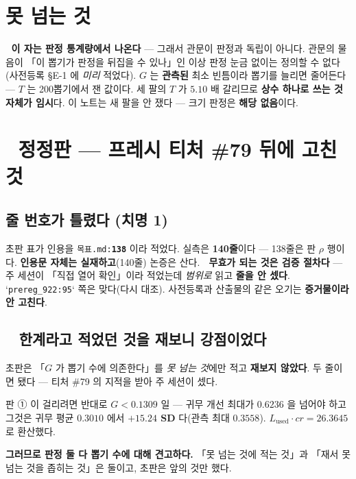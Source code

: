 \documentclass{article}
\begin{document}
\section{못 넘는 것}

🔴 \textbf{이 자는 판정 통계량에서 나온다} --- 그래서 관문이 판정과 독립이 아니다.
관문의 물음이 「이 뽑기가 판정을 뒤집을 수 있나」인 이상 판정 눈금 없이는 정의할 수 없다
(사전등록 §E-1 에 \emph{미리} 적었다).
$G$ 는 \textbf{관측된} 최소 빈틈이라 뽑기를 늘리면 줄어든다 --- $T$ 는 200뽑기에서 잰 값이다.
세 팔의 $T$ 가 $5.10$ 배 갈리므로 \textbf{상수 하나로 쓰는 것 자체가 임시}다.
이 노트는 새 팔을 안 쟀다 --- 크기 판정은 \textbf{해당 없음}이다.

\section{🔴 정정판 --- 프레시 티처 \#79 뒤에 고친 것}

\subsection{줄 번호가 틀렸다 (치명 1)}

초판 표가 인용을 \texttt{목표.md:\textbf{138}} 이라 적었다. 실측은 \textbf{140줄}이다
--- 138줄은 판 $\rho$ 행이다. \textbf{인용문 자체는 실재하고}(140줄) 논증은 산다.
🔴 \textbf{무효가 되는 것은 검증 절차다} --- 주 세션이 「직접 열어 확인」이라 적었는데
\emph{범위로} 읽고 \textbf{줄을 안 셌다}. `\texttt{prereg\_922:95}` 쪽은 맞다(다시 대조).
사전등록과 산출물의 같은 오기는 \textbf{증거물이라 안 고친다}.

\subsection{🔴🔴 한계라고 적었던 것을 재보니 강점이었다}

초판은 「$G$ 가 뽑기 수에 의존한다」를 \emph{못 넘는 것}에만 적고 \textbf{재보지 않았다}.
두 줄이면 됐다 --- 티처 \#79 의 지적을 받아 주 세션이 셌다.

{판 ① 이 걸리려면 반대로 $G < 0.1309$ 일 --- 귀무 개선 최대가 $0.6236$ 을 넘어야 하고
그것은 귀무 평균 $0.3010$ 에서 \textbf{$+15.24$ SD} 다(관측 최대 $0.3558$).
$L_{\text{used}}\cdot cr = 26.3645$ 로 환산했다.}

\textbf{그러므로 판정 둘 다 뽑기 수에 대해 견고하다.}
「못 넘는 것에 적는 것」과 「재서 못 넘는 것을 좁히는 것」은 둘이고, 초판은 앞의 것만 했다.
\end{document}
